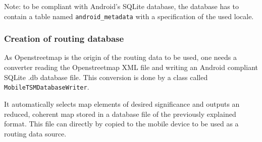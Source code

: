 Note: to be compliant with Android's SQLite database, the database has to contain a table named \texttt{android\_metadata} with a specification of the used locale.


\subsubsection{Creation of routing database}

As Openstreetmap is the origin of the routing data to be used, one needs a converter reading the Openstreetmap XML file and writing an Android compliant SQLite .db database file. This conversion is done by a class called \texttt{MobileTSMDatabaseWriter}.\newline

It automatically selects map elements of desired significance and outputs an reduced, coherent map stored in a database file of the previously explained format. This file can directly by copied to the mobile device to be used as a routing data source.
